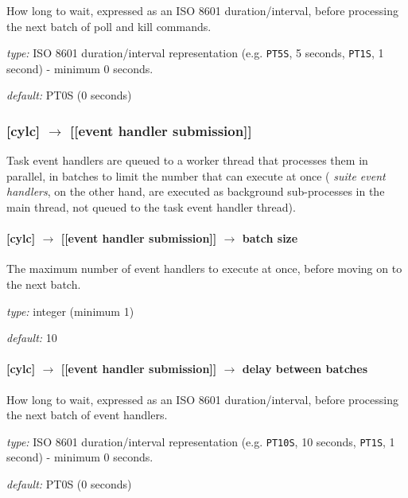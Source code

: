 How long to wait, expressed as an ISO 8601 duration/interval, before
processing the next batch of poll and kill commands.

\begin{myitemize}
    \item {\em type:} ISO 8601 duration/interval representation (e.g.
 \lstinline=PT5S=, 5 seconds, \lstinline=PT1S=, 1 second) - minimum 0 seconds.
    \item {\em default:} PT0S (0 seconds)
\end{myitemize}


\subsubsection[{[[}event handler submission{]]}]{[cylc] $\rightarrow$ [[event handler submission]]}

Task event handlers are queued to a worker thread that processes them in
parallel, in batches to limit the number that can execute at once ({\em
suite event handlers}, on the other hand, are executed as background
sub-processes in the main thread, not queued to the task
event handler thread).

\paragraph[batch size]{[cylc] $\rightarrow$ [[event handler submission]] $\rightarrow$ batch size}

The maximum number of event handlers to execute at once, before moving
on to the next batch.

\begin{myitemize}
    \item {\em type:} integer (minimum 1)
    \item {\em default:} 10
\end{myitemize}

\paragraph[delay between batches]{[cylc] $\rightarrow$ [[event handler submission]] $\rightarrow$ delay between batches}

How long to wait, expressed as an ISO 8601 duration/interval, before
processing the next batch of event handlers.

\begin{myitemize}
    \item {\em type:} ISO 8601 duration/interval representation (e.g.
 \lstinline=PT10S=, 10 seconds, \lstinline=PT1S=, 1 second) - minimum 0
 seconds.
    \item {\em default:} PT0S (0 seconds)
\end{myitemize}

